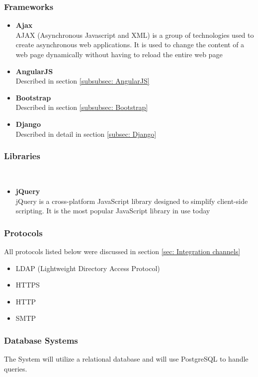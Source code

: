 \documentclass{article}
\begin{document}
	\subsubsection{Frameworks}
	\begin{itemize}

		\item\textbf{Ajax} \\
		AJAX (Asynchronous Javascript and XML) is a group of technologies used to create asynchronous web applications. It is used to change the content of a web page dynamically without having to reload the entire web page
			
		\item\textbf{AngularJS} \\
		Described in section \ref{subsubsec: AngularJS}
			
		\item\textbf{Bootstrap} \\
		Described in section \ref{subsubsec: Bootstrap}
			
		\item\textbf{Django} \\
		Described in detail in section \ref{subsec: Django}
	\end{itemize}
	
	\subsubsection{Libraries}\
	\begin{itemize}
			\item\textbf{jQuery} \\
			jQuery is a cross-platform JavaScript library designed to simplify client-side scripting. It is the most popular JavaScript library in use today
	\end{itemize}
	\subsubsection{Protocols}
		All protocols listed below were discussed in section \ref{sec: Integration channels}
			\begin{itemize}
				\item LDAP (Lightweight Directory Access Protocol)
				\item HTTPS
				\item HTTP
				\item SMTP	
			\end{itemize}
	
	\subsubsection{Database Systems}
		The System will utilize a relational database and will use PostgreSQL to handle queries.
		
\end{document}
